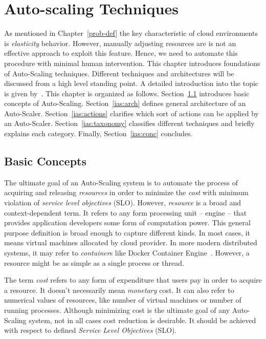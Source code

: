 \chapter{Auto-scaling Techniques}
\label{intro-auto-scale}

As mentioned in Chapter~\ref{prob-def} the key characteristic of cloud environments is \emph{elasticity} behavior. However, manually adjusting resources are is not an effective approach to exploit this feature. Hence, we need to automate this procedure with minimal human intervention. This chapter introduces foundations of Auto-Scaling techniques. Different techniques and architectures will be discussed from a high level standing point. A detailed introduction into the topic is given by~\textcite{Lorido-Botran2014}. This chapter is organized as follows. Section~\ref{ias:basics} introduces basic concepts of Auto-Scaling. Section~\ref{ias:arch} defines general architecture of an Auto-Scaler. Section~\ref{ias:actions} clarifies which sort of actions can be applied by an Auto-Scaler. Section~\ref{ias:taxonomy} classifies different techniques and briefly explains each category. Finally, Section~\ref{ias:conc} concludes.

\section{Basic Concepts}
\label{ias:basics}

The ultimate goal of an Auto-Scaling system is to automate the process of acquiring and releasing \emph{resources} in order to minimize the \emph{cost} with minimum violation of \emph{service level objectives} (SLO). However, \emph{resource} is a broad and context-dependent term. It refers to any form processing unit -- engine -- that provides application developers some form of computation power. This general purpose definition is broad enough to capture different kinds. In most cases, it means virtual machines allocated by cloud provider. In more modern distributed systems, it may refer to \emph{container}s like Docker Container Engine~\cite{docker}. However, a resource might be as simple as a single process or thread.

The term \emph{cost} refers to any form of expenditure that users pay in order to acquire a resource. It doesn't necessarily mean \emph{monetary} cost. It can also refer to numerical values of resources, like number of virtual machines or number of running processes. Although minimizing cost is the ultimate goal of any Auto-Scaling system, not in all cases cost reduction is desirable. It should be achieved with respect to defined \emph{Service Level Objectives} (SLO).

